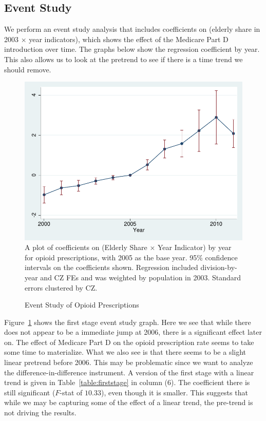 \documentclass[12pt]{article}
\begin{document}
\subsection{Event Study}
We perform an event study analysis that includes coefficients on (elderly share in 2003 $\times$ year indicators), which shows the effect of the Medicare Part D introduction over time.  The graphs below show the regression coefficient by year.  This also allows us to look at the pretrend to see if there is a time trend we should remove.

\begin{figure}[htbp]
    \centering
    \caption{Event Study of Opioid Prescriptions}
    \begin{minipage}{0.75\textwidth}
    \includegraphics[width=\textwidth]{figs/event_fs.pdf}
    \footnotesize
    A plot of coefficients on (Elderly Share $\times$ Year Indicator) by year for opioid prescriptions, with 2005 as the base year.  95\% confidence intervals on the coefficients shown.  Regression included division-by-year and CZ FEs and was weighted by population in 2003.  Standard errors clustered by CZ\@.
    \end{minipage}
    \label{figure:eventfirstraw}
\end{figure}

Figure~\ref{figure:eventfirstraw} shows the first stage event study graph.  Here we see that while there does not appear to be a immediate jump at 2006, there is a significant effect later on.  The effect of Medicare Part D on the opioid prescription rate seems to take some time to materialize.  What we also see is that there seems to be a slight linear pretrend before 2006.  This may be problematic since we want to analyze the difference-in-difference instrument.  A version of the first stage with a linear trend is given in Table~\ref{table:firststage} in column (6).  The coefficient there is still significant ($F$-stat of $10.33$), even though it is smaller.  
This suggests that while we may be capturing some of the effect of a linear trend, the pre-trend is not driving the results.
\end{document}
